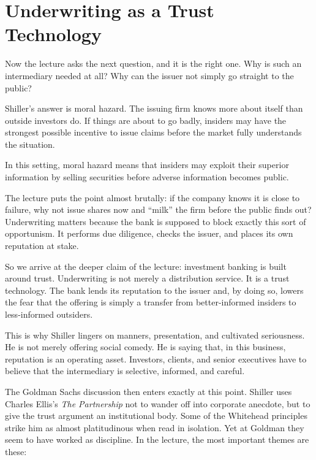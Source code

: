 \section{Underwriting as a Trust Technology}

Now the lecture asks the next question, and it is the right one. Why is such an intermediary needed at all? Why can the issuer not simply go straight to the public?

Shiller's answer is moral hazard. The issuing firm knows more about itself than outside investors do. If things are about to go badly, insiders may have the strongest possible incentive to issue claims before the market fully understands the situation.

\begin{definition}
In this setting, moral hazard means that insiders may exploit their superior information by selling securities before adverse information becomes public.
\end{definition}

The lecture puts the point almost brutally: if the company knows it is close to failure, why not issue shares now and ``milk'' the firm before the public finds out? Underwriting matters because the bank is supposed to block exactly this sort of opportunism. It performs due diligence, checks the issuer, and places its own reputation at stake.

So we arrive at the deeper claim of the lecture: investment banking is built around trust. Underwriting is not merely a distribution service. It is a trust technology. The bank lends its reputation to the issuer and, by doing so, lowers the fear that the offering is simply a transfer from better-informed insiders to less-informed outsiders.

This is why Shiller lingers on manners, presentation, and cultivated seriousness. He is not merely offering social comedy. He is saying that, in this business, reputation is an operating asset. Investors, clients, and senior executives have to believe that the intermediary is selective, informed, and careful.

The Goldman Sachs discussion then enters exactly at this point. Shiller uses Charles Ellis's \emph{The Partnership} not to wander off into corporate anecdote, but to give the trust argument an institutional body. Some of the Whitehead principles strike him as almost platitudinous when read in isolation. Yet at Goldman they seem to have worked as discipline. In the lecture, the most important themes are these:

